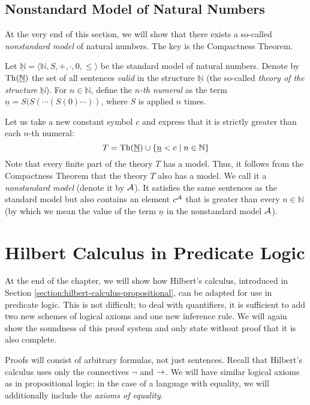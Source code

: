 \subsection{Nonstandard Model of Natural Numbers}

At the very end of this section, we will show that there exists a so-called \emph{nonstandard model} of natural numbers. The key is the Compactness Theorem.
    
Let $\underline{\mathbb N}=\langle\mathbb N,S,+,\cdot,0,\leq\rangle$ be the standard model of natural numbers. Denote by $\operatorname{Th}(\underline{\mathbb N})$ the set of all sentences \emph{valid} in the structure $\underline{\mathbb N}$ (the so-called \emph{theory of the structure} $\underline{\mathbb N}$). For $n\in \mathbb N$, define the \emph{$n$-th numeral} as the term $\underline n=S(S(\cdots (S(0)\cdots))$, where $S$ is applied $n$ times.

Let us take a new constant symbol $c$ and express that it is strictly greater than each $n$-th numeral:
$$
T=\operatorname{Th}(\underline{\mathbb N})\cup\{\underline n<c\mid n\in \mathbb N\}
$$
Note that every finite part of the theory $T$ has a model. Thus, it follows from the Compactness Theorem that the theory $T$ also has a model. We call it a \emph{nonstandard model} (denote it by $\mathcal{A}$). It satisfies the same sentences as the standard model but also contains an element $c^{\mathcal{A}}$ that is greater than every $n\in \mathbb N$ (by which we mean the value of the term $\underline n$ in the nonstandard model $\mathcal{A}$).
    

\section{Hilbert Calculus in Predicate Logic}

At the end of the chapter, we will show how Hilbert's calculus, introduced in Section \ref{section:hilbert-calculus-propositional}, can be adapted for use in predicate logic. This is not difficult; to deal with quantifiers, it is sufficient to add two new schemes of logical axioms and one new inference rule. We will again show the soundness of this proof system and only state without proof that it is also complete.

Proofs will consist of arbitrary formulas, not just sentences. Recall that Hilbert's calculus uses only the connectives $\neg$ and ${\mathbin{\rightarrow}}$. We will have similar logical axioms as in propositional logic; in the case of a language with equality, we will additionally include the \emph{axioms of equality}. 

